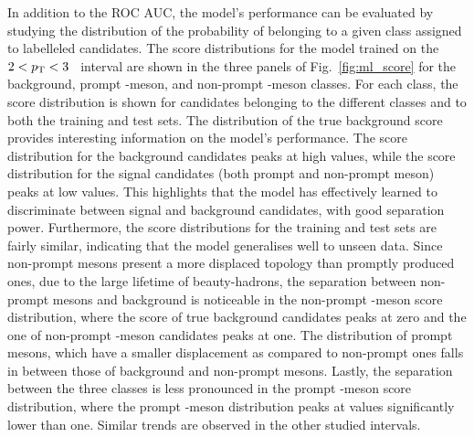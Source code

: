 \begin{sloppypar}
In addition to the ROC AUC, the model's performance can be evaluated by studying the distribution of the probability of belonging to a given class assigned to labelleled candidates. The score distributions for the model trained on the \mbox{$2<p_\mathrm{T}<3$~\gevc} interval are shown in the three panels of Fig.~\ref{fig:ml_score} for the background, prompt \ds-meson, and non-prompt \ds-meson classes. For each class, the score distribution is shown for candidates belonging to the different classes and to both the training and test sets. The distribution of the true background score provides interesting information on the model's performance. The score distribution for the background candidates peaks at high values, while the score distribution for the signal candidates (both prompt and non-prompt \ds meson) peaks at low values. This highlights that the model has effectively learned to discriminate between signal and background candidates, with good separation power. Furthermore, the score distributions for the training and test sets are fairly similar, indicating that the model generalises well to unseen data. Since non-prompt \ds mesons present a more displaced topology than promptly produced ones, due to the large lifetime of beauty-hadrons, the separation between non-prompt \ds mesons and background is noticeable in the non-prompt \ds-meson score distribution, where the score of true background candidates peaks at zero and the one of non-prompt \ds-meson candidates peaks at one. The distribution of prompt \ds mesons, which have a smaller displacement as compared to non-prompt ones falls in between those of background and non-prompt \ds mesons. Lastly, the separation between the three classes is less pronounced in the prompt \ds-meson score distribution, where the prompt \ds-meson distribution peaks at values significantly lower than one. Similar trends are observed in the other studied \pt intervals. 
\end{sloppypar}

